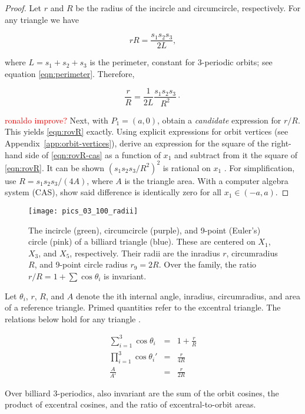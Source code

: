 \begin{proof}
Let $r$ and $R$ be the radius of the incircle and circumcircle, respectively. For any triangle \cite{coxeter67} we have

\begin{equation*}
 r R=\frac{s_1s_2s_3}{2 L}, 
\end{equation*}

\noindent where $L=s_1+s_2+s_3$ is the perimeter, constant for 3-periodic orbits; see equation \eqref{eqn:perimeter}. Therefore,

\begin{equation}
\frac{r}{R}=\frac{1}{2L} \frac{s_1s_2s_3}{R^2}\cdot
\label{eqn:rovR-cas}
\end{equation}

\textcolor{red}{ronaldo improve?}
Next, with $P_1=(a,0)$, obtain a {\em candidate} expression for $r/R$. This yields \eqref{eqn:rovR} exactly. Using explicit expressions for orbit vertices (see Appendix~\ref{app:orbit-vertices}), derive an expression for the square of the right-hand side of \eqref{eqn:rovR-cas} as a function of $x_1$ and subtract from it the square of \eqref{eqn:rovR}. It can be shown $\left(s_1s_2s_3/R^2\right)^2$ is rational on $x_1$ \cite{reznik2020-loci}. For simplification, use $R=s_1 s_2 s_3/(4A)$, where $A$ is the triangle area. With a computer algebra system (CAS), show said difference is identically zero for all $x_1\in(-a,a)$.
\end{proof}


\begin{figure}
    \centering
    \texttt{[image: pics\_03\_100\_radii]}
    \caption{The incircle (green), circumcircle (purple), and 9-point (Euler's) circle (pink) of a billiard triangle (blue). These are centered on $X_1$, $X_3$, and $X_5$, respectively. Their radii are the inradius $r$, circumradius $R$, and 9-point circle radius $r_9=2R$. Over the family, the ratio $r/R=1+\sum\cos{\theta_i}$ is invariant.}
    \label{fig:radii}
\end{figure}

Let $\theta_i$, $r$, $R$, and $A$ denote the ith internal angle, inradius, circumradius, and area of a reference triangle. Primed quantities refer to the excentral triangle. The relations below hold for any triangle \cite{johnson29}. 

\begin{eqnarray}
\sum_{i=1}^{3}{\cos\theta_i}&=&1+\frac{r}{R} \label{eqn:sum-cos} \\
\prod_{i=1}^{3}{\cos\theta_i'}&=&\frac{r}{4R} \label{eqn:exc-prod-cos} \\
\frac{A}{A'}&=&\frac{r}{2R}
\label{eqn:area-ratio}
\end{eqnarray}

\begin{corollary}
Over billiard 3-periodics, also invariant are the sum of the orbit cosines, the product of excentral cosines, and the ratio of excentral-to-orbit areas.
\end{corollary}